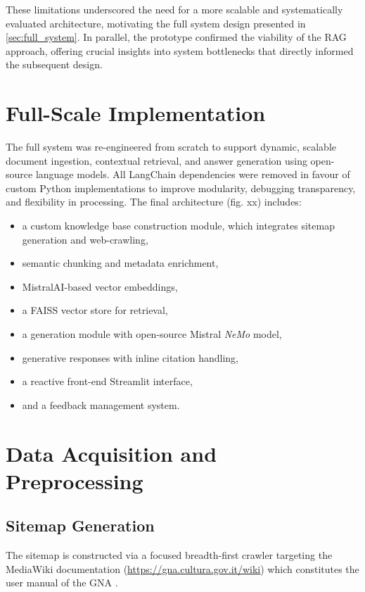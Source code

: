 \begin{spacing}{1.5}
These limitations underscored the need for a more scalable and systematically evaluated architecture, motivating the full system design presented in \autoref{sec:full_system}. In parallel, the prototype confirmed the viability of the RAG approach, offering crucial insights into system bottlenecks that directly informed the subsequent design.


\section{Full-Scale Implementation}\label{sec:full_system}
The full system was re-engineered from scratch to support dynamic, scalable document ingestion, contextual retrieval, and answer generation using open-source language models. All LangChain dependencies were removed in favour of custom Python implementations to improve modularity, debugging transparency, and flexibility in processing. The final architecture (fig. xx) includes:
\begin{itemize}
      \item a custom knowledge base construction module, which integrates sitemap generation and web-crawling,
      \item semantic chunking and metadata enrichment,
      \item MistralAI-based vector embeddings,
      \item a FAISS vector store for retrieval,
      \item a generation module with open-source Mistral \textit{NeMo} model,
      \item generative responses with inline citation handling,
      \item a reactive front-end Streamlit interface,
      \item and a feedback management system.
\end{itemize}

\sloppy
\section{Data Acquisition and Preprocessing}
\subsection{Sitemap Generation}
The sitemap is constructed via a focused breadth-first crawler targeting the MediaWiki documentation (\url{https://gna.cultura.gov.it/wiki}) which constitutes the user manual of the GNA \citep{mic_mic_2019}. 


\end{spacing}
